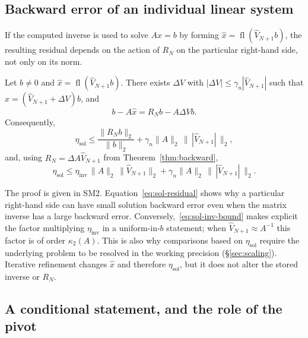 \documentclass[review,onefignum,onetabnum]{siamart251216}
\newcommand{\fl}{\operatorname{fl}}
\begin{document}
\subsection{Backward error of an individual linear system}
\label{sec:solution-theory}

If the computed inverse is used to solve $Ax=b$ by forming
$\widehat x=\fl(\widehat V_{N+1}b)$, the resulting residual depends on the action of $R_N$ on the
particular right-hand side, not only on its norm.

\begin{proposition}\label{prop:sol-vs-inv}
Let $b\ne0$ and $\widehat x=\fl(\widehat V_{N+1}b)$. There exists $\Delta V$ with
$|\Delta V|\le\gamma_n|\widehat V_{N+1}|$ such that
$\widehat x=(\widehat V_{N+1}+\Delta V)b$, and
%
\begin{equation}\label{eq:sol-residual}
b-A\widehat x=R_Nb-A\Delta Vb.
\end{equation}
%
Consequently,
%
\begin{equation}\label{eq:sol-bound}
\eta_{\mathrm{sol}}
\le
\frac{\|R_Nb\|_2}{\|b\|_2}
+
\gamma_n\|A\|_2\,\bigl\|\,|\widehat V_{N+1}|\,\bigr\|_2,
\end{equation}
%
and, using $R_N=\Delta A\widehat V_{N+1}$ from Theorem~\ref{thm:backward},
%
\begin{equation}\label{eq:sol-inv-bound}
\eta_{\mathrm{sol}}
\le
\eta_{\mathrm{inv}}\,\|A\|_2\,\|\widehat V_{N+1}\|_2
+
\gamma_n\|A\|_2\,\bigl\|\,|\widehat V_{N+1}|\,\bigr\|_2.
\end{equation}
\end{proposition}

The proof is given in SM2. Equation~\eqref{eq:sol-residual} shows why a particular right-hand side
can have small solution backward error even when the matrix inverse has a large backward error.
Conversely,~\eqref{eq:sol-inv-bound} makes explicit the factor multiplying
$\eta_{\mathrm{inv}}$ in a uniform-in-$b$ statement; when
$\widehat V_{N+1}\approx A^{-1}$ this factor is of order $\kappa_2(A)$. This is also why
comparisons based on $\eta_{\mathrm{sol}}$ require the underlying problem to be resolved in the
working precision (\S\ref{sec:scaling}). Iterative refinement changes $\widehat x$ and therefore
$\eta_{\mathrm{sol}}$, but it does not alter the stored inverse or $R_N$.

\subsection{A conditional statement, and the role of the pivot}
\label{sec:conditional}
\end{document}
